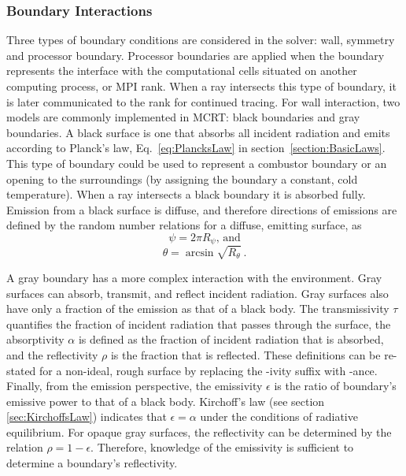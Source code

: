\subsubsection{Boundary Interactions}
Three types of boundary conditions are considered in the solver: wall, symmetry and processor boundary. Processor boundaries are applied when the boundary represents the interface with the computational cells situated on another computing process, or MPI rank. When a ray intersects this type of boundary, it is later communicated to the rank for continued tracing.
For wall interaction, two models are commonly implemented in MCRT: black boundaries and gray boundaries.
A black surface is one that absorbs all incident radiation and emits according to Planck's law, Eq.~\ref{eq:PlancksLaw} in section~\ref{section:BasicLaws}. 
This type of boundary could be used to represent a combustor boundary or an opening to the surroundings (by assigning the boundary a constant, cold temperature). 
When a ray intersects a black boundary it is absorbed fully. Emission from a black surface is diffuse, and therefore directions of emissions are defined by the random number relations for a diffuse, emitting surface, as
\begin{equation}
    \psi{}=2\pi{}R_\psi\text{, and}
    \label{eq:diffuse_emission_psi}
\end{equation}
\begin{equation}
    \theta = \arcsin{\sqrt{R_\theta}}~.
    \label{eq:diffuse_emission_theta}
\end{equation}

A gray boundary has a more complex interaction with the environment. Gray surfaces can absorb, transmit, and reflect incident radiation. Gray surfaces also have only a fraction of the emission as that of a black body.
The transmissivity $\tau{}$ quantifies the fraction of incident radiation that passes through the surface, the absorptivity $\alpha$ is defined as the fraction of incident radiation that is absorbed, and the reflectivity $\rho$ is the fraction that is reflected. These definitions can be re-stated for a non-ideal, rough surface by replacing the -ivity suffix with -ance. 
Finally, from the emission perspective, the emissivity $\epsilon$ is the ratio of boundary's emissive power to that of a black body.  Kirchoff's law (see section \ref{sec:KirchoffsLaw}) indicates that $\epsilon{}=\alpha{}$ under the conditions of radiative equilibrium.
For opaque gray surfaces, the reflectivity can be determined by the relation $\rho{}=1-\epsilon$. Therefore, knowledge of the emissivity is sufficient to determine a boundary's reflectivity.

